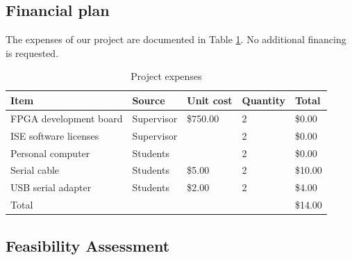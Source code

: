 \begin{itemlist}
\subsection{Financial plan} %


The expenses of our project are documented in Table \ref{expenses-table}.
No additional financing is requested.

\begin{table}[h!]
	\centering
	\begin{tabular}{ | l | l | l | l | l | }
		\hline
		\textbf{Item} & \textbf{Source} & \textbf{Unit cost} & \textbf{Quantity} & \textbf{Total} \\
		\hline \hline
		FPGA development board & Supervisor & \$750.00 & 2 & \$0.00 \\
		ISE software licenses & Supervisor & & 2 & \$0.00 \\
		Personal computer & Students & & 2 & \$0.00 \\
		Serial cable & Students & \$5.00 & 2 & \$10.00 \\
		USB serial adapter & Students & \$2.00 & 2 & \$4.00 \\
		\hline
		Total & & & & \$14.00 \\
		\hline
	\end{tabular}
	\caption{Project expenses}
	\label{expenses-table}
\end{table}


\subsection{Feasibility Assessment}

% 


\end{itemlist}
